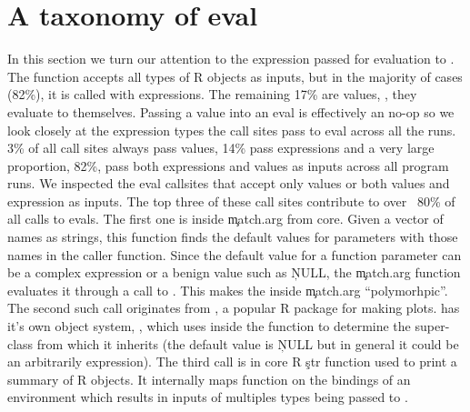 \documentclass[conference]{IEEEtran}
\newcommand{\AllValueInputEvalCallPerc}{17\%\xspace}
\newcommand{\AllExpressionInputEvalCallPerc}{82\%\xspace}
\newcommand{\AllExpressionInputEvalSitePerc}{14\%\xspace}
\newcommand{\AllValueInputEvalSitePerc}{3\%\xspace}
\newcommand{\AllPolymorphicInputEvalSitePerc}{82\%\xspace}
\begin{document}
\section{A taxonomy of eval}


In this section we turn our attention to the expression passed for evaluation to
\eval. The \eval function accepts all types of R objects as inputs, but in the
majority of cases (\AllExpressionInputEvalCallPerc), it is called with
expressions. The remaining \AllValueInputEvalCallPerc are values, \ie, they
evaluate to themselves.
%
Passing a value into an eval is effectively an no-op so we look closely at the
expression types the call sites pass to eval across all the runs.
\AllValueInputEvalSitePerc of all call sites always pass values,
\AllExpressionInputEvalSitePerc pass expressions and a very large proportion,
\AllPolymorphicInputEvalSitePerc, pass both expressions and values as inputs
across all program runs. We inspected the eval callsites that accept only values
or both values and expression as inputs. The top three of these call sites
contribute to over ~80\% of all calls to evals. The first one is inside
\c{match.arg} from core. Given a vector of names as strings, this function finds
the default values for parameters with those names in the caller function. Since
the default value for a function parameter can be a complex expression or a
benign value such as \c{NULL}, the \c{match.arg} function evaluates it through a
call to \eval. This makes the \eval inside \c{match.arg} ``polymorhpic''. The
second such \eval call originates from \ggplot, a popular R package for making
plots. \ggplot has it's own object system, \ggproto, which uses \eval inside the
\ggproto function to determine the super-class from which it inherits (the
default value is \c{NULL} but in general it could be an arbitrarily expression).
The third \eval call is in core R \c{str} function used to print a summary of R
objects. It internally maps \eval function on the bindings of an environment
which results in inputs of multiples types being passed to \eval.
\end{document}
